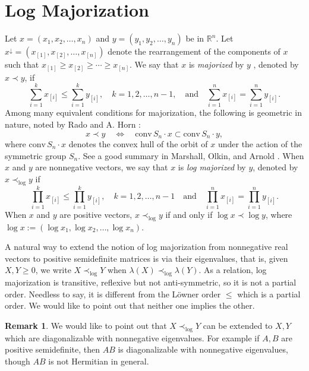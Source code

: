 \documentclass[12pt, reqno]{amsart}
\numberwithin{equation}{section}
\theoremstyle{definition}
\newtheorem{remark}[theorem]{Remark}
\renewcommand{\ge}{\geqslant}
\renewcommand{\le}{\leqslant}
\def\R{\mathbb R}
\def\conv{{\mbox{conv}\,}}
\begin{document}
\section{Log Majorization}

Let $x = (x_1, x_2, \dots, x_n)$ and $y = (y_1, y_2, \dots, y_n)$ be in $\R^n$. Let $x^{\downarrow} = (x_{[1]}, x_{[2]}, \dots, x_{[n]})$ denote the rearrangement of the components of $x$ such that $x_{[1]} \ge  x_{[2]} \ge \cdots \ge x_{[n]}$. 
We say that $x$ is {\it majorized} by $y$ \cite{MOA11} , denoted by $x \prec y$,  if 
\[
\sum_{i=1}^k x_{[i]} \le \sum_{i=1}^k y_{[i]}, \quad k = 1, 2, \dots, n-1, \quad \text{and} \quad \sum_{i=1}^n x_{[i]} = \sum_{i=1}^n y_{[i]}.
\]
Among many equivalent conditions for majorization, the following is geometric in nature, noted by Rado \cite{R52}
 and
{A. Horn} \cite{Ho54}:
\[
x \prec y \quad \Leftrightarrow \quad \conv S_n \cdot x \subset \conv S_n \cdot y,
\]
where $\conv S_n \cdot x$ denotes the convex hull of the orbit of $x$ under the action of the symmetric group $S_n$. {See a good summary in Marshall, Olkin, and Arnold \cite[p.10-14, p.34] {MOA11}.}
When $x$ and $y$ are nonnegative vectors, we say that $x$ is {\it log majorized} by $y$, denoted by $x \prec_{\log} y$ if 
\[
\prod_{i=1}^k x_{[i]} \le \prod_{i=1}^k y_{[i]}, \quad k = 1, 2, \dots, n-1 \quad \text{and} \quad  \prod_{i=1}^n x_{[i]} = \prod_{i=1}^n y_{[i]}.
\]
{When} $x$ and $y$ are positive  vectors, $x \prec_{\log} y$ if and only if $\log x \prec \log y$, where $\log x:=(\log x_1, \log x_2, \dots, \log x_n)$. 

A natural way to extend the notion of log majorization from nonnegative real vectors  to positive semidefinite matrices is via their eigenvalues, that is,
given $X, Y\ge 0$, we write $X\prec_{\log} Y$ when $\lambda(X) \prec_{\log} \lambda (Y)$.  As a relation, log majorization is transitive, reflexive but not anti-symmetric, so it is not a partial order. Needless to say, it is  different from the L\"owner order $\le$ which is a partial order. We would like to point out that neither one implies the other. 

\begin{remark}\label{log-hyperbolic}
We would like to point out that $X\prec_{\log} Y$ can be extended to $X, Y$ which are diagonalizable with nonnegative eigenvalues. For example if $A, B$ are positive semidefinite, then $AB$ is diagonalizable with nonnegative eigenvalues, though $AB$ is not Hermitian in general.
\end{remark}
\end{document}
